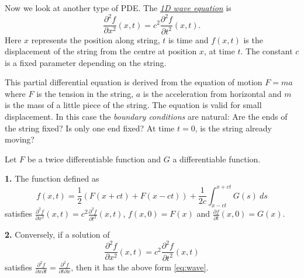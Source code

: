 Now we look at another type of PDE.
The \href{https://en.wikipedia.org/wiki/Wave_equation}{\emph{1D wave equation}} is
\[
    \frac{\partial^2 f}{\partial x^2}(x,t) = c^2  \frac{\partial^2 f}{\partial t^2}(x,t).
\]
Here \(x\) represents the position along string,
\(t\) is time and \(f(x,t)\) is the displacement of the string from the centre at position \(x\), at time \(t\).
The constant \(c\) is a fixed parameter depending on the string.

This partial differential equation is derived from the equation of motion \(F = m a\) where \(F\) is the tension in the string, \(a\) is the acceleration from horizontal and \(m\) is the mass of a little piece of the string.
The equation is valid for small displacement.
In this case the \emph{boundary conditions} are natural: Are the ends of the string fixed? Is only one end fixed? At time \(t=0\), is the string already moving?

\begin{theorem}
    Let \(F\) be a twice differentiable function and \(G\) a differentiable function.

    \noindent
    \textbf{1.} The function defined as
    \begin{equation}
        \label{eq:wave}
        f(x,t) = \frac{1}{2}(F(x+ct) + F(x-ct)) + \frac{1}{2c} \int_{x-ct}^{x+ct} G(s) \ ds
    \end{equation}
    satisfies \(   \frac{\partial^2 f}{\partial x^2}(x,t) = c^2  \frac{\partial^2 f}{\partial t^2}(x,t) \),
    \(f(x,0) = F(x)\)
    and \(\frac{\partial f}{\partial t}(x,0) = G(x)\).

    \noindent
    \textbf{2.} Conversely, if a solution of
    \[
        \frac{\partial^2 f}{\partial x^2}(x,t) = c^2  \frac{\partial^2 f}{\partial t^2}(x,t)
    \]
    satisfies
    \(\frac{\partial^2 f}{\partial x \partial t} = \frac{\partial^2 f}{\partial t \partial x}\),
    then it has the above form \eqref{eq:wave}.
\end{theorem}



